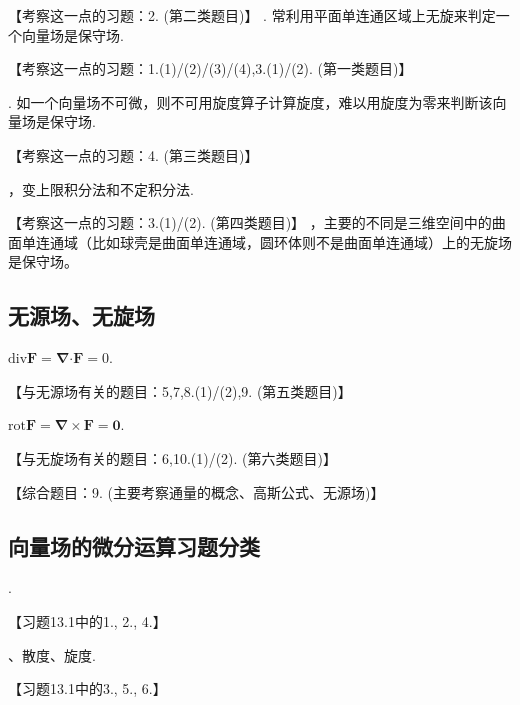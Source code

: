 \documentclass[12pt,UTF8,fleqn]{ctexart}
\begin{document}
\begin{enumerate}
【考察这一点的习题：2. (第二类题目)】
. 常利用平面单连通区域上无旋来判定一个向量场是保守场.

【考察这一点的习题：1.(1)/(2)/(3)/(4),3.(1)/(2). (第一类题目)】

. 如一个向量场不可微，则不可用旋度算子计算旋度，难以用旋度为零来判断该向量场是保守场.

【考察这一点的习题：4. (第三类题目)】

，变上限积分法和不定积分法.

【考察这一点的习题：3.(1)/(2). (第四类题目)】
，主要的不同是三维空间中的曲面单连通域（比如球壳是曲面单连通域，圆环体则不是曲面单连通域）上的无旋场是保守场。
\end{enumerate}
\subsection{无源场、无旋场}
\begin{enumerate}
$\text{div}\bm F=\bm\nabla\bm\cdot\bm F=0$.

【与无源场有关的题目：5,7,8.(1)/(2),9. (第五类题目)】

$\text{rot}\bm F=\bm\nabla\times\bm F=\bm0$.

【与无旋场有关的题目：6,10.(1)/(2). (第六类题目)】

【综合题目：9. (主要考察通量的概念、高斯公式、无源场)】
\end{enumerate}
\subsection{向量场的微分运算习题分类}
\begin{enumerate}
.

【习题13.1中的1., 2., 4.】

、散度、旋度.

【习题13.1中的3., 5., 6.】
\end{enumerate}
\end{document}
